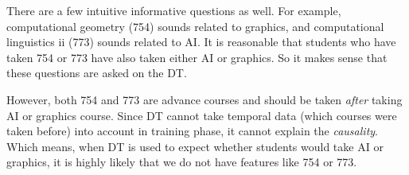 There are a few intuitive informative questions as well. For example, computational geometry (754) sounds related to graphics, and computational linguistics ii (773) sounds related to AI. It is reasonable that students who have taken 754 or 773 have also taken either AI or graphics. So it makes sense that these questions are asked on the DT.

However, both 754 and 773 are advance courses and should be taken \emph{after} taking AI or graphics course. Since DT cannot take temporal data (which courses were taken before) into account in training phase, it cannot explain the \emph{causality}. Which means, when DT is used to expect whether students would take AI or graphics, it is highly likely that we do not have features like 754 or 773.
